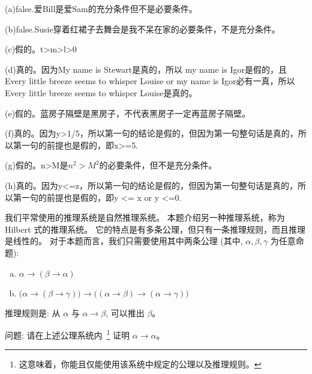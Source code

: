 \documentclass[a4paper, justified]{tufte-handout}
\begin{document}
\begin{solution}

  (a)false.爱Bill是爱Sam的充分条件但不是必要条件。

  (b)false.Susie穿着红裙子去舞会是我不呆在家的必要条件，不是充分条件。

  (c)假的。t>m>l>0

  (d)真的。因为My name is Stewart是真的，所以 my name is Igor是假的，且Every little breeze seems to whisper Louise or my name is Igor必有一真，所以Every little breeze seems to whisper Louise是真的。

  (e)假的。蓝房子隔壁是黑房子，不代表黑房子一定再蓝房子隔壁。

  (f)真的。因为y>1/5，所以第一句的结论是假的，但因为第一句整句话是真的，所以第一句的前提也是假的，即x>=5.

  (g)假的。n>M是$n^2>M^2$的必要条件，但不是充分条件。

  (h)真的。因为y<=z，所以第一句的结论是假的，但因为第一句整句话是真的，所以第一句的前提也是假的，即y <= x or y <=0.
\end{solution}

\beginoptional
\begin{problem}
我们平常使用的推理系统是自然推理系统。
本题介绍另一种推理系统，称为 Hilbert 式的推理系统。
它的特点是有多条公理，但只有一条推理规则，而且推理是线性的。
对于本题而言，我们只需要使用其中两条公理
(其中, $\alpha, \beta, \gamma$ 为任意命题):
\begin{enumerate}[(a)]
  \item $\alpha \to (\beta \to \alpha)$
  \item $\big(\alpha \to (\beta \to \gamma)\big) \to
          \big((\alpha \to \beta) \to (\alpha \to \gamma) \big)$
\end{enumerate}
推理规则是: 从 $\alpha$ 与 $\alpha \to \beta$, 可以推出 $\beta$。

\vspace{8pt}
\noindent 问题: 请在上述公理系统内~\footnote{这意味着，你能且仅能使用该系统中规定的公理以及推理规则。}
证明 $\alpha \to \alpha$。
\end{problem}

\begin{solution}
\end{solution}
\end{document}
